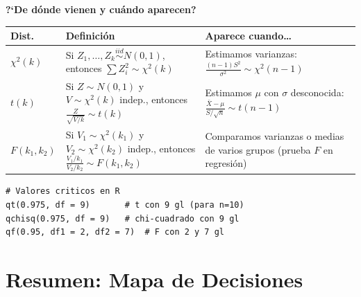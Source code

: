 \documentclass[11pt, a4paper]{article}
\begin{document}
\textbf{?`De d\'onde vienen y cu\'ando aparecen?}

\begin{center}
\begin{tabular}{p{2cm}p{4.5cm}p{5cm}}
\toprule
\textbf{Dist.} & \textbf{Definici\'on} & \textbf{Aparece cuando\ldots} \\
\midrule
$\chi^2(k)$ &
  Si $Z_1, \ldots, Z_k \overset{iid}{\sim} N(0,1)$, entonces
  $\sum Z_i^2 \sim \chi^2(k)$ &
  Estimamos varianzas: $\frac{(n-1)S^2}{\sigma^2} \sim \chi^2(n-1)$ \\[6pt]
$t(k)$ &
  Si $Z \sim N(0,1)$ y $V \sim \chi^2(k)$ indep., entonces
  $\frac{Z}{\sqrt{V/k}} \sim t(k)$ &
  Estimamos $\mu$ con $\sigma$ desconocida: $\frac{\bar{X}-\mu}{S/\sqrt{n}} \sim t(n-1)$ \\[6pt]
$F(k_1,k_2)$ &
  Si $V_1 \sim \chi^2(k_1)$ y $V_2 \sim \chi^2(k_2)$ indep., entonces
  $\frac{V_1/k_1}{V_2/k_2} \sim F(k_1,k_2)$ &
  Comparamos varianzas o medias de varios grupos (prueba $F$ en regresi\'on) \\
\bottomrule
\end{tabular}
\end{center}

\begin{lstlisting}
# Valores criticos en R
qt(0.975, df = 9)       # t con 9 gl (para n=10)
qchisq(0.975, df = 9)   # chi-cuadrado con 9 gl
qf(0.95, df1 = 2, df2 = 7)  # F con 2 y 7 gl
\end{lstlisting}

\section{Resumen: Mapa de Decisiones}
\end{document}
